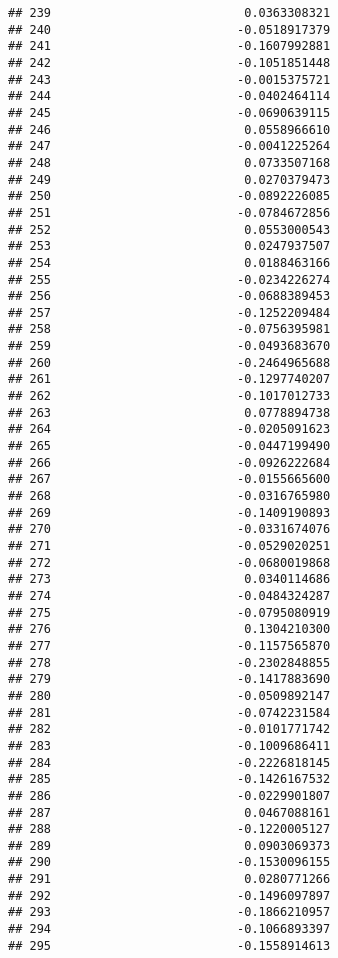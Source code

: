 \documentclass[
]{article}
\begin{document}
\begin{verbatim}
## 239                           0.0363308321
## 240                          -0.0518917379
## 241                          -0.1607992881
## 242                          -0.1051851448
## 243                          -0.0015375721
## 244                          -0.0402464114
## 245                          -0.0690639115
## 246                           0.0558966610
## 247                          -0.0041225264
## 248                           0.0733507168
## 249                           0.0270379473
## 250                          -0.0892226085
## 251                          -0.0784672856
## 252                           0.0553000543
## 253                           0.0247937507
## 254                           0.0188463166
## 255                          -0.0234226274
## 256                          -0.0688389453
## 257                          -0.1252209484
## 258                          -0.0756395981
## 259                          -0.0493683670
## 260                          -0.2464965688
## 261                          -0.1297740207
## 262                          -0.1017012733
## 263                           0.0778894738
## 264                          -0.0205091623
## 265                          -0.0447199490
## 266                          -0.0926222684
## 267                          -0.0155665600
## 268                          -0.0316765980
## 269                          -0.1409190893
## 270                          -0.0331674076
## 271                          -0.0529020251
## 272                          -0.0680019868
## 273                           0.0340114686
## 274                          -0.0484324287
## 275                          -0.0795080919
## 276                           0.1304210300
## 277                          -0.1157565870
## 278                          -0.2302848855
## 279                          -0.1417883690
## 280                          -0.0509892147
## 281                          -0.0742231584
## 282                          -0.0101771742
## 283                          -0.1009686411
## 284                          -0.2226818145
## 285                          -0.1426167532
## 286                          -0.0229901807
## 287                           0.0467088161
## 288                          -0.1220005127
## 289                           0.0903069373
## 290                          -0.1530096155
## 291                           0.0280771266
## 292                          -0.1496097897
## 293                          -0.1866210957
## 294                          -0.1066893397
## 295                          -0.1558914613

\end{verbatim}
\end{document}
